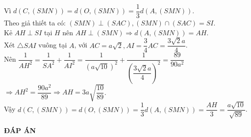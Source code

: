 \begin{bt}
{\begin{enumerate}
		Vì $ d(C,(SMN))=d(O,(SMN))=\dfrac{1}{3}d(A,(SMN)) $.\\
		Theo giả thiết ta có: $ (SMN)\perp (SAC), (SMN)\cap (SAC)=SI $. \\
		Kẻ $ AH\perp SI $ tại $ H $ nên $ AH\perp (SMN)\Rightarrow d(A,(SMN))=AH $.\\
		Xét $ \triangle   SAI $ vuông tại $ A $, với $ AC=a\sqrt{2}, AI=\dfrac{3}{4}AC=\dfrac{3\sqrt{2}a}{4} $. \\
		Nên $ \dfrac{1}{AH^2}=\dfrac{1}{SA^2}+\dfrac{1}{AI^2}=\dfrac{1}{\left(a\sqrt{10}\right)^2}+\dfrac{1}{\left(\dfrac{3\sqrt{2}a}{4}\right)^2}=\dfrac{89}{90a^2} $\\
		$ \Rightarrow AH^2=\dfrac{90a^2}{89} \Rightarrow AH=3a\sqrt{\dfrac{10}{89}} $.\\
		Vậy $ d(C,(SMN))=d(O,(SMN))=\dfrac{1}{3}d(A,(SMN))=\dfrac{AH}{3}=\dfrac{a\sqrt{10}}{\sqrt{89}} $.
	\end{enumerate}	
	}
\end{bt}
\newpage
\begin{center}
	\textbf{ĐÁP ÁN}
\end{center}
\begin{multicols}{10}
	
\end{multicols}

